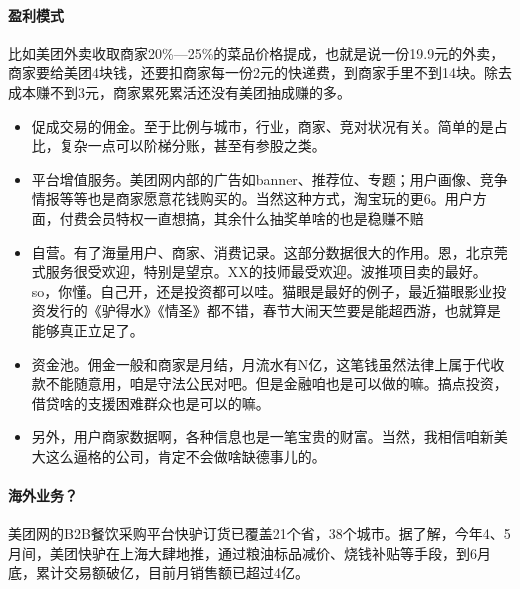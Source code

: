 \documentclass[letterpaper,10pt,english]{sphinxmanual}
\begin{document}
\paragraph{盈利模式}
\label{\detokenize{chapter_AI_company/meituan:id8}}
比如美团外卖收取商家20\%—25\%的菜品价格提成，也就是说一份19.9元的外卖，商家要给美团4块钱，还要扣商家每一份2元的快递费，到商家手里不到14块。除去成本赚不到3元，商家累死累活还没有美团抽成赚的多。%
\begin{footnote}[1035]\sphinxAtStartFootnote
{}
%
\end{footnote}
\begin{itemize}
\item {} 
促成交易的佣金。至于比例与城市，行业，商家、竞对状况有关。简单的是占比，复杂一点可以阶梯分账，甚至有参股之类。

\item {} 
平台增值服务。美团网内部的广告如banner、推荐位、专题；用户画像、竞争情报等等也是商家愿意花钱购买的。当然这种方式，淘宝玩的更6。用户方面，付费会员特权一直想搞，其余什么抽奖单啥的也是稳赚不赔

\item {} 
自营。有了海量用户、商家、消费记录。这部分数据很大的作用。恩，北京莞式服务很受欢迎，特别是望京。XX的技师最受欢迎。波推项目卖的最好。so，你懂。自己开，还是投资都可以哇。猫眼是最好的例子，最近猫眼影业投资发行的《驴得水》《情圣》都不错，春节大闹天竺要是能超西游，也就算是能够真正立足了。

\item {} 
资金池。佣金一般和商家是月结，月流水有N亿，这笔钱虽然法律上属于代收款不能随意用，咱是守法公民对吧。但是金融咱也是可以做的嘛。搞点投资，借贷啥的支援困难群众也是可以的嘛。

\item {} 
另外，用户商家数据啊，各种信息也是一笔宝贵的财富。当然，我相信咱新美大这么逼格的公司，肯定不会做啥缺德事儿的。%
\begin{footnote}[1036]\sphinxAtStartFootnote
{}
%
\end{footnote}

\end{itemize}


\paragraph{海外业务？}
\label{\detokenize{chapter_AI_company/meituan:id9}}
美团网的B2B餐饮采购平台快驴订货已覆盖21个省，38个城市。据了解，今年4、5月间，美团快驴在上海大肆地推，通过粮油标品减价、烧钱补贴等手段，到6月底，累计交易额破亿，目前月销售额已超过4亿。
\end{document}
